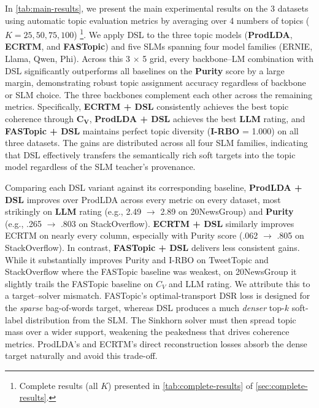 \documentclass{article}
\theoremstyle{plain}
\theoremstyle{definition}
\theoremstyle{remark}
\begin{document}
In \autoref{tab:main-results}, we present the main experimental
results on the 3 datasets using automatic topic evaluation metrics
by averaging over 4 numbers of topics ($K = 25, 50, 75, 100$)%
\footnote{Complete results (all $K$) presented in
\autoref{tab:complete-results} of \autoref{sec:complete-results}.}.
We apply DSL to the three topic models (\textbf{ProdLDA}, \textbf{ECRTM}, and \textbf{FASTopic})
and five SLMs spanning four model families (ERNIE, Llama, Qwen, Phi).
Across this 3 $\times$ 5 grid, every backbone--LM combination with
DSL significantly outperforms all baselines on the \textbf{Purity}
score by a large margin, demonstrating robust topic assignment
accuracy regardless of backbone or SLM choice. The three backbones
complement each other across the remaining metrics. Specifically,  \textbf{ECRTM +
DSL} consistently achieves the best topic coherence through
$\mathbf{C_V}$, \textbf{ProdLDA + DSL} achieves the best \textbf{LLM}
rating, and \textbf{FASTopic + DSL} maintains perfect topic diversity
(\textbf{I-RBO} = 1.000) on all three datasets. The gains are
distributed across all four SLM families, indicating that DSL
effectively transfers the semantically rich soft targets into the
topic model regardless of the SLM teacher's provenance.

Comparing each DSL variant against its corresponding
baseline, \textbf{ProdLDA + DSL} improves over ProdLDA across every
metric on every dataset, most strikingly on \textbf{LLM} rating
(e.g., 2.49 $\to$ 2.89 on 20NewsGroup) and \textbf{Purity} (e.g.,
.265 $\to$ .803 on StackOverflow). \textbf{ECRTM + DSL} similarly
improves ECRTM on nearly every column, especially with Purity score (.062 $\to$ .805 on StackOverflow). In contrast,
\textbf{FASTopic + DSL} delivers less consistent gains. While it
substantially improves Purity and I-RBO on TweetTopic and
StackOverflow where the FASTopic baseline was weakest, on
20NewsGroup it slightly trails the FASTopic baseline on $C_V$ and
LLM rating. We attribute this to a target--solver mismatch.
FASTopic's optimal-transport DSR loss is designed for the
\textit{sparse} bag-of-words target, whereas DSL produces a much
\textit{denser} top-$k$ soft-label distribution from the SLM. The
Sinkhorn solver must then spread topic mass over a wider support,
weakening the peakedness that drives coherence metrics. ProdLDA's
and ECRTM's direct reconstruction losses absorb the dense target
naturally and avoid this trade-off.
\end{document}
